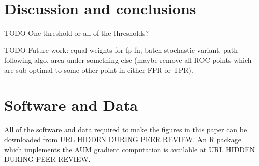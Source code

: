 \documentclass{article}
\begin{document}
\section{Discussion and conclusions}
\label{sec:discussion}

TODO One threshold or all of the thresholds?

TODO Future work: equal weights for fp fn, batch stochastic variant, path following algo, area under something else (maybe remove all ROC points which are sub-optimal to some other point in either FPR or TPR).


\section*{Software and Data}

All of the software and data required to make the figures in this paper can be downloaded from URL HIDDEN DURING PEER REVIEW. An R package which implements the AUM gradient computation is available at URL HIDDEN DURING PEER REVIEW.







\end{document}

